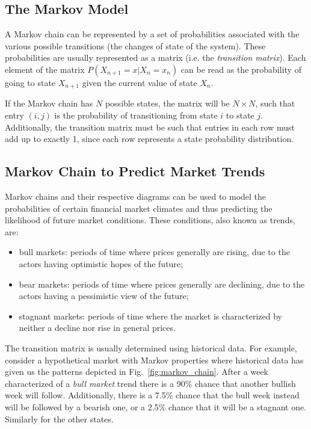 \subsection{The Markov Model}
A Markov chain can be represented by a set of probabilities associated with the various possible transitions (the changes of state of the system). These probabilities are usually represented as a matrix (i.e. the \emph{transition matrix}).
Each element of the matrix $P(X_{n+1} = x | X_n = x_n)$ can be read as the probability of going to state $X_{n+1}$ given the current value of state $X_n$. 

If the Markov chain has $N$ possible states, the matrix will be $N \times N$, such that entry $(i, j)$ is the probability of transitioning from state $i$ to state $j$. Additionally, the transition matrix must be such that entries in each row must add up to exactly 1, since each row represents a state probability distribution.


\subsection{Markov Chain to Predict Market Trends}
Markov chains and their respective diagrams can be used to model the probabilities of certain financial market climates and thus predicting the likelihood of future market conditions.
These conditions, also known as trends, are:
\begin{itemize}
\item bull markets: periods of time where prices generally are rising, due to the actors having optimistic hopes of the future;
\item bear markets: periods of time where prices generally are declining, due to the actors having a pessimistic view of the future;
\item stagnant markets: periods of time where the market is characterized by neither a decline nor rise in general prices.
\end{itemize}

The transition matrix is usually determined using historical data. For example, consider a hypothetical market with Markov properties where historical data has given us the patterns depicted in Fig.~\ref{fig:markov_chain}.
After a week characterized of a \emph{bull market} trend there is a 90\% chance that another bullish week will follow. Additionally, there is a 7.5\% chance that the bull week instead will be followed by a bearish one, or a 2.5\% chance that it will be a stagnant one. Similarly for the other states. 

